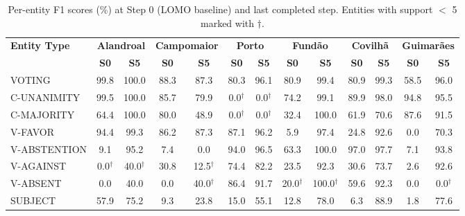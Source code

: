 \begin{table}[t]
\centering
\caption{Per-entity F1 scores (\%) at Step 0 (LOMO baseline) and last completed step. Entities with support $<$ 5 marked with $\dagger$.}
\label{tab:per_entity_f1}
\scriptsize
\setlength{\tabcolsep}{3pt}
\begin{tabular}{l cc cc cc cc cc cc}
\toprule
\textbf{Entity Type} & \multicolumn{2}{c}{\textbf{Alandroal}} & \multicolumn{2}{c}{\textbf{Campomaior}} & \multicolumn{2}{c}{\textbf{Porto}} & \multicolumn{2}{c}{\textbf{Fundão}} & \multicolumn{2}{c}{\textbf{Covilhã}} & \multicolumn{2}{c}{\textbf{Guimarães}} \\
\cmidrule(lr){2-3} \cmidrule(lr){4-5} \cmidrule(lr){6-7} \cmidrule(lr){8-9} \cmidrule(lr){10-11} \cmidrule(lr){12-13} 
 & \textbf{S0} & \textbf{S5} & \textbf{S0} & \textbf{S5} & \textbf{S0} & \textbf{S5} & \textbf{S0} & \textbf{S5} & \textbf{S0} & \textbf{S5} & \textbf{S0} & \textbf{S5} \\
\midrule
VOTING & 99.8 & 100.0 & 88.3 & 87.3 & 80.3 & 96.1 & 80.9 & 99.4 & 80.9 & 99.3 & 58.5 & 96.0 \\
C-UNANIMITY & 99.5 & 100.0 & 85.7 & 79.9 & 0.0$^\dagger$ & 0.0$^\dagger$ & 74.2 & 99.1 & 89.9 & 98.0 & 94.8 & 95.5 \\
C-MAJORITY & 64.4 & 100.0 & 80.0 & 48.9 & 0.0$^\dagger$ & 0.0$^\dagger$ & 32.4 & 100.0 & 61.9 & 70.6 & 87.6 & 91.5 \\
V-FAVOR & 94.4 & 99.3 & 86.2 & 87.3 & 87.1 & 96.2 & 5.9 & 97.4 & 24.8 & 92.6 & 0.0 & 70.3 \\
V-ABSTENTION & 9.1 & 95.2 & 7.4 & 0.0 & 94.0 & 96.5 & 63.3 & 100.0 & 97.0 & 97.7 & 7.1 & 93.8 \\
V-AGAINST & 0.0$^\dagger$ & 40.0$^\dagger$ & 30.8 & 12.5$^\dagger$ & 74.4 & 82.2 & 23.5 & 92.3 & 30.6 & 73.7 & 2.6 & 92.6 \\
V-ABSENT & 0.0 & 40.0 & 0.0 & 40.0$^\dagger$ & 86.4 & 91.7 & 20.0$^\dagger$ & 100.0$^\dagger$ & 59.6 & 92.3 & 0.0 & 0.0$^\dagger$ \\
SUBJECT & 57.9 & 75.2 & 9.3 & 23.8 & 15.0 & 55.1 & 12.8 & 78.0 & 6.3 & 88.9 & 1.8 & 77.6 \\
\bottomrule
\end{tabular}
\end{table}